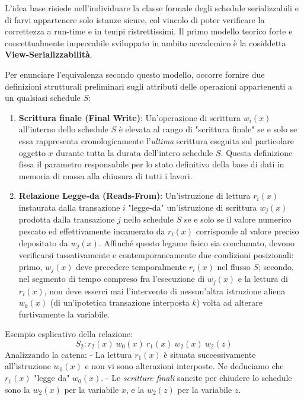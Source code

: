 L'idea base risiede nell'individuare la classe formale degli schedule serializzabili e di farvi appartenere solo istanze sicure, col vincolo di poter verificare la correttezza a run-time e in tempi ristrettissimi. Il primo modello teorico forte e concettualmente impeccabile sviluppato in ambito accademico è la cosiddetta \textbf{View-Serializzabilità}.

Per enunciare l'equivalenza secondo questo modello, occorre fornire due definizioni strutturali preliminari sugli attributi delle operazioni appartenenti a un qualsiasi schedule $S$:
\begin{enumerate}
    \item \textbf{Scrittura finale (Final Write)}: Un'operazione di scrittura $w_i(x)$ all'interno dello schedule $S$ è elevata al rango di "scrittura finale" se e solo se essa rappresenta cronologicamente l'\textit{ultima} scrittura eseguita sul particolare oggetto $x$ durante tutta la durata dell'intero schedule $S$. Questa definizione fissa il parametro responsabile per lo stato definitivo della base di dati in memoria di massa alla chiusura di tutti i lavori.
    \item \textbf{Relazione Legge-da (Reads-From)}: Un'istruzione di lettura $r_i(x)$ instaurata dalla transazione $i$ "legge-da" un'istruzione di scrittura $w_j(x)$ prodotta dalla transazione $j$ nello schedule $S$ se e solo se il valore numerico pescato ed effettivamente incamerato da $r_i(x)$ corrisponde al valore preciso depositato da $w_j(x)$. Affinché questo legame fisico sia conclamato, devono verificarsi tassativamente e contemporaneamente due condizioni posizionali: primo, $w_j(x)$ deve precedere temporalmente $r_i(x)$ nel flusso $S$; secondo, nel segmento di tempo compreso fra l'esecuzione di $w_j(x)$ e la lettura di $r_i(x)$, non deve esserci mai l'intervento di nessun'altra istruzione aliena $w_k(x)$ (di un'ipotetica transazione interposta $k$) volta ad alterare furtivamente la variabile.
\end{enumerate}

Esempio esplicativo della relazione:
$$S_2: r_2(x) \ w_0(x) \ r_1(x) \ w_2(x) \ w_2(z)$$
Analizzando la catena:
- La lettura $r_1(x)$ è situata successivamente all'istruzione $w_0(x)$ e non vi sono alterazioni interposte. Ne deduciamo che $r_1(x)$ "legge da" $w_0(x)$.
- Le \textit{scritture finali} sancite per chiudere lo schedule sono la $w_2(x)$ per la variabile $x$, e la $w_2(z)$ per la variabile $z$.

